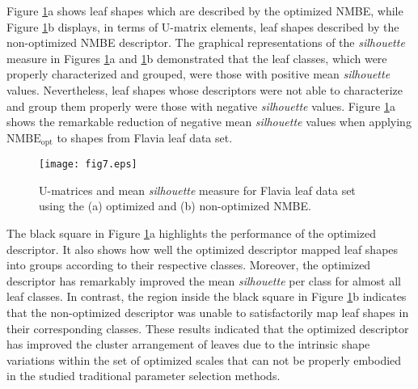 Figure \ref{fig:MatrizU_leaves_256}a shows leaf shapes which are described by the optimized NMBE, while Figure \ref{fig:MatrizU_leaves_256}b displays, in terms of U-matrix elements, leaf shapes described by the non-optimized NMBE descriptor.  The graphical representations of the \emph{silhouette}  measure in Figures \ref{fig:MatrizU_leaves_256}a and \ref{fig:MatrizU_leaves_256}b demonstrated that the leaf classes, which were properly characterized and grouped, were those with positive mean \emph{silhouette} values. Nevertheless, leaf shapes whose descriptors were not able to characterize and group them properly were those with negative  \emph{silhouette} values. Figure \ref{fig:MatrizU_leaves_256}a shows the remarkable  reduction of negative mean \emph{silhouette} values when applying $\operatorname{NMBE_{opt}}$ to shapes from Flavia leaf data set. 

\begin{figure}[t]
\centering
\texttt{[image: fig7.eps]}
 \caption{\label{fig:MatrizU_leaves_256}U-matrices and mean \emph{silhouette} measure for Flavia leaf data set using the (a) optimized and (b) non-optimized NMBE.}
\end{figure}

The black square in Figure \ref{fig:MatrizU_leaves_256}a highlights  the performance of the optimized descriptor. It also shows how well the optimized descriptor mapped leaf shapes into groups according to their respective classes.  Moreover, the optimized descriptor has remarkably improved  the mean \emph{silhouette} per class for almost all leaf classes. In contrast, the region inside the black square in Figure \ref{fig:MatrizU_leaves_256}b indicates that the non-optimized descriptor was unable to satisfactorily map leaf shapes in their corresponding classes.
These results  indicated that the optimized descriptor has improved the cluster arrangement of leaves due to the intrinsic shape variations within the set of optimized scales that can not be properly embodied in the studied traditional parameter selection methods.

